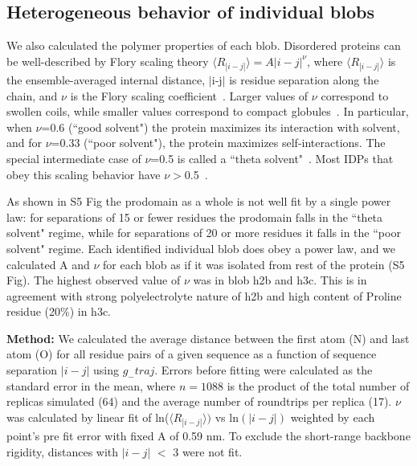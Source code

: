 \documentclass[10pt,letterpaper]{article}
\begin{document}
\subsection*{Heterogeneous behavior of individual blobs}
\label{sec:scaling}

We also calculated the polymer properties of each blob. Disordered proteins can be well-described by Flory scaling theory $\langle R_{|i-j|}\rangle = A|i-j|^{\nu}$, where $\langle R_{|i-j|}\rangle$ is the ensemble-averaged internal distance, $|$i-j$|$ is residue separation along the chain, and $\nu$ is the Flory scaling coefficient~\cite{Flory1949}. Larger values of $\nu$ correspond to swollen coils, while smaller values correspond to compact globules~\cite{Das2013}. In particular, when $\nu$=0.6 (``good solvent") the protein maximizes its interaction with solvent, and for $\nu$=0.33 (``poor solvent"), the protein maximizes self-interactions. The special intermediate case of $\nu$=0.5 is called a ``theta solvent"~\cite{Flory1949}. Most IDPs that obey this scaling behavior have $\nu$$>$0.5~\cite{Hofmann2012,Das2013,Zerze2015,Meng2018}. 

As shown in S5 Fig the prodomain as a whole is not well fit by a single power law: for separations of 15 or fewer residues the prodomain falls in the ``theta solvent" regime, while for separations of 20 or more residues it falls in the ``poor solvent" regime. Each identified individual blob does obey a power law, and we calculated A and $\nu$ for each blob as if it was isolated from rest of the protein (S5 Fig). The highest observed value of $\nu$ was in blob h2b and h3c. This is in agreement with strong polyelectrolyte nature of h2b and high content of Proline residue (20\%) in h3c.

\textbf{Method:} We calculated the average distance between the first atom (N) and last atom (O) for all residue pairs of a given sequence as a function of sequence separation $|i-j|$ using $g_{-}traj$. Errors before fitting were calculated as the standard error in the mean, where $n = 1088$ is the product of the total number of replicas simulated (64) and the average number of roundtrips per replica (17). $\nu$ was calculated by linear fit of ln($\langle R_{|i-j|}\rangle)$ vs ln$(|i-j|)$ weighted by each point's pre fit error with fixed A of 0.59 nm. To exclude the short-range backbone rigidity, distances with $|i-j|$ $<$ 3 were not fit.
\end{document}
